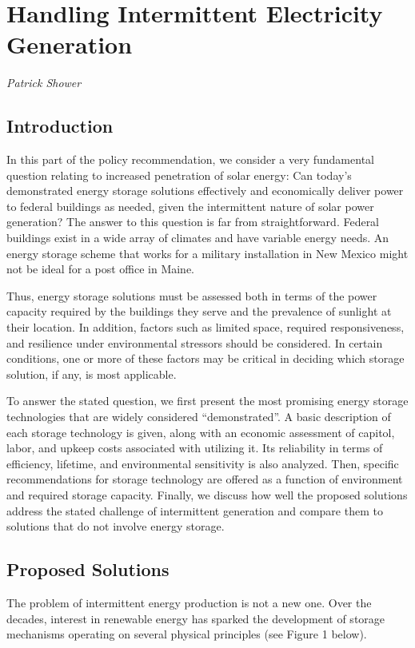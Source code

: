 \section{Handling Intermittent Electricity Generation}
\textit{Patrick Shower}

\subsection{Introduction}

In this part of the policy recommendation, we consider a very fundamental 
question relating to increased penetration of solar energy: Can today's
demonstrated energy storage solutions effectively and economically deliver
power to federal buildings as needed, given the intermittent nature of solar
power generation? The answer to this question is far from straightforward.
Federal buildings exist in a wide array of climates and have variable energy
needs. An energy storage scheme that works for a military installation in New
Mexico might not be ideal for a post office in Maine.

Thus, energy storage solutions must be assessed both in terms of the power
capacity required by the buildings they serve and the prevalence of sunlight at
their location. In addition, factors such as limited space, required
responsiveness, and resilience under environmental stressors should be
considered. In certain conditions, one or more of these factors may be critical
in deciding which storage solution, if any, is most applicable.

To answer the stated question, we first present the most promising energy
storage technologies that are widely considered ``demonstrated''. A basic
description of each storage technology is given, along with an economic
assessment of capitol, labor, and upkeep costs associated with utilizing it.
Its reliability in terms of efficiency, lifetime, and environmental sensitivity
is also analyzed. Then, specific recommendations for storage technology are
offered as a function of environment and required storage capacity. Finally, we
discuss how well the proposed solutions address the stated challenge of
intermittent generation and compare them to solutions that do not involve
energy storage.

\subsection{Proposed Solutions}

The problem of intermittent energy production is not a new one. Over the
decades, interest in renewable energy has sparked the development of storage
mechanisms operating on several physical principles (see Figure 1 below).

